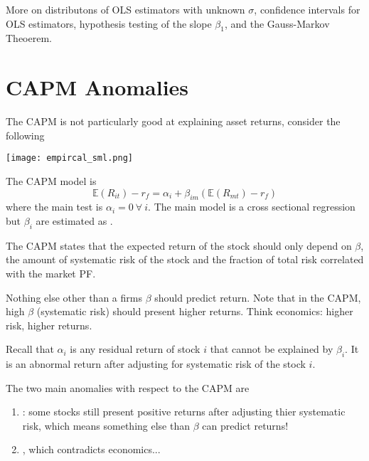 \documentclass[12pt]{scrartcl}
\newcommand{\E}{\mathbb{E}}
\begin{document}
More on distributons of OLS estimators with unknown $\sigma$, confidence intervals 
for OLS estimators, hypothesis testing of the slope $\beta_1$, and the Gauss-Markov Theoerem.

\section{CAPM Anomalies}

The CAPM is not particularly good at explaining asset returns, consider the following 

\texttt{[image: empircal\_sml.png]}

\begin{note}
  The CAPM model is 
  \[\E(R_{it}) - r_f = \alpha_i + \beta_{im} (\E(R_{mt}) - r_f)\]
  where the main test is $\alpha_i = 0 \ \forall \ i$. The main model is a cross 
  sectional regression but $\beta_i$ are estimated as .
\end{note}

\begin{note}
  The CAPM states that the expected return of the stock should only depend on $\beta$,
  the amount of systematic risk of the stock and the fraction of total risk correlated with the market PF.
  
  Nothing else other than a firms $\beta$ should predict return. Note that in the CAPM, high $\beta$ (systematic risk) should 
  present higher returns. Think economics: higher risk, higher returns.
\end{note}

\begin{definition}
  Recall that  $\alpha_i$ is any residual return of stock $i$ that cannot 
  be explained by $\beta_i$. It is an abnormal return after adjusting for systematic risk of
  the stock $i$. 
\end{definition}

\begin{remark}
  The two main anomalies with respect to the CAPM are
  \begin{enumerate}
    \item {}: some stocks still present positive returns after adjusting thier systematic risk, which means something else than $\beta$ can predict returns!
    \item {}, which contradicts economics...
  \end{enumerate}
\end{remark}
\end{document}
